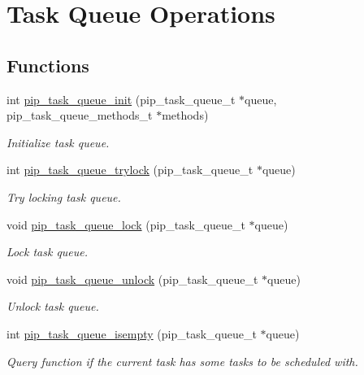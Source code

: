 \hypertarget{group__ULP-1-task-queue}{\section{Task Queue Operations}
\label{group__ULP-1-task-queue}
}
\subsection*{Functions}
\begin{DoxyCompactItemize}
\item 
int \hyperlink{group__ULP-1-task-queue_ga9c50d9b2b810d97a75a5fe9c332902e0}{pip\-\_\-task\-\_\-queue\-\_\-init} (pip\-\_\-task\-\_\-queue\-\_\-t $\ast$queue, pip\-\_\-task\-\_\-queue\-\_\-methods\-\_\-t $\ast$methods)
\begin{DoxyCompactList}\small\item\em Initialize task queue. \end{DoxyCompactList}\item 
int \hyperlink{group__ULP-1-task-queue_ga20d50746c585f1ede68f2c9aefc39a5c}{pip\-\_\-task\-\_\-queue\-\_\-trylock} (pip\-\_\-task\-\_\-queue\-\_\-t $\ast$queue)
\begin{DoxyCompactList}\small\item\em Try locking task queue. \end{DoxyCompactList}\item 
void \hyperlink{group__ULP-1-task-queue_gaf7f6e26e29752a148704108bdcc7756f}{pip\-\_\-task\-\_\-queue\-\_\-lock} (pip\-\_\-task\-\_\-queue\-\_\-t $\ast$queue)
\begin{DoxyCompactList}\small\item\em Lock task queue. \end{DoxyCompactList}\item 
void \hyperlink{group__ULP-1-task-queue_gaf4cfe9905f1862718f65ba2fda961b84}{pip\-\_\-task\-\_\-queue\-\_\-unlock} (pip\-\_\-task\-\_\-queue\-\_\-t $\ast$queue)
\begin{DoxyCompactList}\small\item\em Unlock task queue. \end{DoxyCompactList}\item 
int \hyperlink{group__ULP-1-task-queue_gabf772cd5ea121458291801a26dea5c9d}{pip\-\_\-task\-\_\-queue\-\_\-isempty} (pip\-\_\-task\-\_\-queue\-\_\-t $\ast$queue)
\begin{DoxyCompactList}\small\item\em Query function if the current task has some tasks to be scheduled with. \end{DoxyCompactList}\item 

\end{DoxyCompactItemize}
